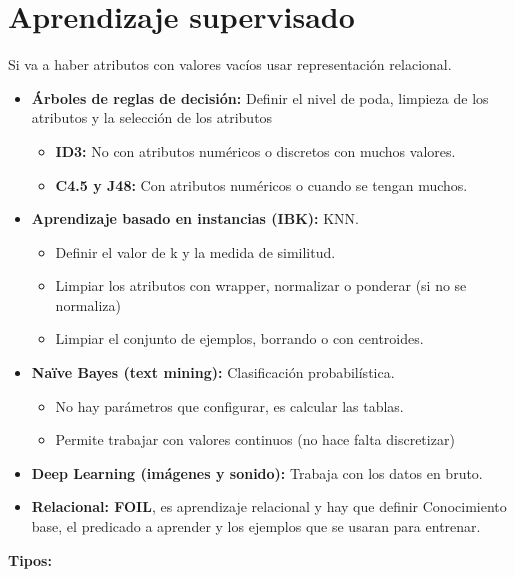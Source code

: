 \documentclass[12pt, twoside, openright]{report} %
\begin{document}
\section{Aprendizaje supervisado}
Si va a haber atributos con valores vacíos usar representación relacional.
\begin{itemize}
  \item \textbf{Árboles de reglas de decisión:} Definir el nivel de poda, limpieza de los atributos y la selección de los atributos
  \begin{itemize}
    \item \textbf{ID3:} No con atributos numéricos o discretos con muchos valores.
    \item \textbf{C4.5 y J48:} Con atributos numéricos o cuando se tengan muchos.
  \end{itemize}
  \item \textbf{Aprendizaje basado en instancias (IBK):} KNN.
  \begin{itemize}
    \item Definir el valor de k y la medida de similitud.
    \item Limpiar los atributos con wrapper, normalizar o ponderar (si no se normaliza)
    \item Limpiar el conjunto de ejemplos, borrando o con centroides.
  \end{itemize}
  \item \textbf{Naïve Bayes (text mining):} Clasificación probabilística.
  \begin{itemize}
    \item No hay parámetros que configurar, es calcular las tablas.
    \item Permite trabajar con valores continuos (no hace falta discretizar)
  \end{itemize}
  \item \textbf{Deep Learning (imágenes y sonido):} Trabaja con los datos en bruto.
  \item \textbf{Relacional: FOIL}, es aprendizaje relacional y hay que definir Conocimiento base, el predicado a aprender y los ejemplos que se usaran para entrenar.
\end{itemize}
\textbf{Tipos:}
\end{document}
